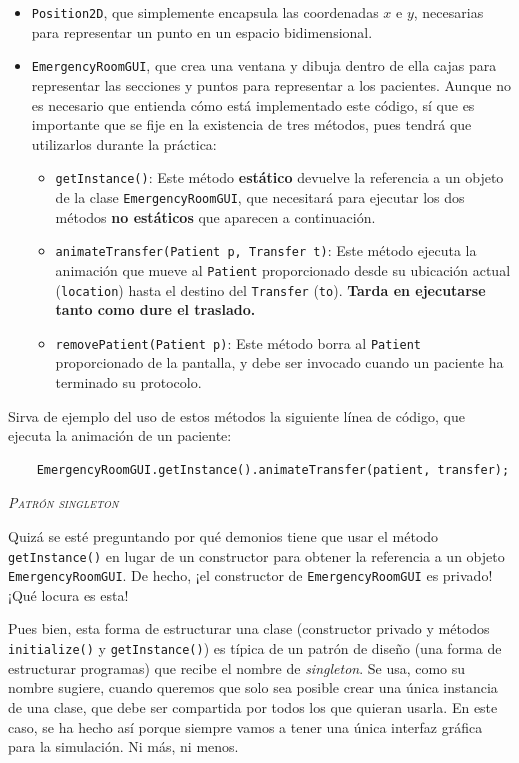 \documentclass[10pt,a4paper,spanish]{article}
\newcommand{\sombreado}[2]{
  \begin{shaded}
    \begin{center} \emph{\textsc{#1}} \end{center}
    \noindent #2\\
  \end{shaded}
}
\newcommand{\code}[1]{\texttt{#1}}
\begin{document}
\begin{itemize}
    \item \code{Position2D}, que simplemente encapsula las coordenadas $x$ e $y$, necesarias para representar un punto en un espacio bidimensional.
    \item \code{EmergencyRoomGUI}, que crea una ventana y dibuja dentro de ella cajas para representar las secciones y puntos para representar a los pacientes. Aunque no es necesario que entienda cómo está implementado este código, sí que es importante que se fije en la existencia de tres métodos, pues tendrá que utilizarlos durante la práctica:

    \begin{itemize}
        \item \code{getInstance()}: Este método \textbf{estático} devuelve la referencia a un objeto de la clase \code{EmergencyRoomGUI}, que necesitará para ejecutar los dos métodos \textbf{no estáticos} que aparecen a continuación.
        \item \code{animateTransfer(Patient p, Transfer t)}: Este método ejecuta la animación que mueve al \code{Patient} proporcionado desde su ubicación actual (\code{location}) hasta el  destino del \code{Transfer} (\code{to}). \textbf{Tarda en ejecutarse tanto como dure el traslado.}
        \item \code{removePatient(Patient p)}: Este método borra al \code{Patient} proporcionado de la pantalla, y debe ser invocado cuando un paciente ha terminado su protocolo. 
    \end{itemize}
\end{itemize}

Sirva de ejemplo del uso de estos métodos la siguiente línea de código, que ejecuta la animación de un paciente:

\begin{verbatim}
    EmergencyRoomGUI.getInstance().animateTransfer(patient, transfer);
\end{verbatim}

\sombreado{Patrón singleton}{Quizá se esté preguntando por qué demonios tiene que usar el método \code{getInstance()} en lugar de un constructor para obtener la referencia a un objeto \code{EmergencyRoomGUI}. De hecho, ¡el constructor de \code{EmergencyRoomGUI} es privado! ¡Qué locura es esta!

Pues bien, esta forma de estructurar una clase (constructor privado y métodos \code{initialize()} y \code{getInstance()}) es típica de un patrón de diseño (una forma de estructurar programas) que recibe el nombre de \textit{singleton}. Se usa, como su nombre sugiere, cuando queremos que solo sea posible crear una única instancia de una clase, que debe ser compartida por todos los que quieran usarla. En este caso, se ha hecho así porque siempre vamos a tener una única interfaz gráfica para la simulación. Ni más, ni menos.}
\end{document}
